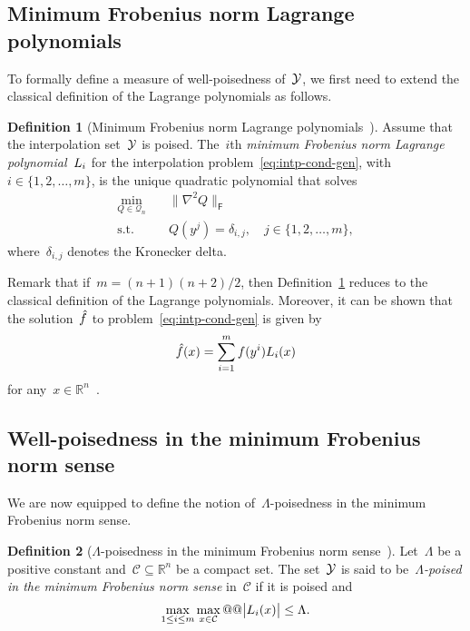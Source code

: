 \documentclass{article}
\makeatletter
\newcounter{cite}
\numberwithin{equation}{section}
\theoremstyle{definition}
\newtheorem{definition}{Definition}[section]
\theoremstyle{plain}
\theoremstyle{remark}
\newcommand*{\abs}[2][]{#1\lvert#2#1\rvert}
\newcommand*{\norm}[2][]{#1\lVert#2#1\rVert}
\newcommand*{\set}[2][]{#1\{#2#1\}}
\newcommand*{\obj}{f}
\newcommand*{\objm}[1][]{\hat{\obj}\ifblank{#1}{}{^{#1}}}
\newcommand*{\R}{\mathbb{R}}
\newcommand*{\lagp}[1][]{L\ifblank{#1}{}{_{#1}}}
\newcommand*{\xpt}[1][]{\mathcal{Y}\ifblank{#1}{}{^{@#1}}}
\newcommand*{\qpoly}{\mathcal{Q}_n}
\newcommand{\reviewed}[1]{\texorpdfstring{{\color{NavyBlue}#1}}{#1}}
\makeatother
\begin{document}
\subsection{\reviewed{Minimum Frobenius norm} Lagrange polynomials}

To formally define a measure of well-poisedness of~$\xpt$, we first need to extend the classical definition of the Lagrange polynomials as follows.

\begin{definition}[\reviewed{Minimum Frobenius norm} Lagrange polynomials~{\cite[Definition~5.1]{Conn_Scheinberg_Vicente_2009}}]
    \label{def:min-norm-lagp}
    Assume that the interpolation set~$\xpt$ is poised.
    The~$i$th \emph{\reviewed{minimum Frobenius norm} Lagrange polynomial}~$\lagp[i]$ for the interpolation problem~\eqref{eq:intp-cond-gen}, with~$i \in \set{1, 2, \dots, m}$, is the unique quadratic polynomial that solves
    \begin{equation*}
        \begin{aligned}
            \min_{Q \in \qpoly} & \quad \norm[\big]{\nabla^2 Q}_{\mathsf{F}}\\
            \text{s.t.}         & \quad Q(y^j) = \delta_{i, j}, \quad j \in \set{1, 2, \dots, m},
        \end{aligned}
    \end{equation*}
    where~$\delta_{i, j}$ denotes the Kronecker delta.
\end{definition}

Remark that if~$m = (n + 1) (n + 2) / 2$, then Definition~\ref{def:min-norm-lagp} reduces to the classical definition of the Lagrange polynomials.
Moreover, it can be shown that the solution~$\objm$ to problem~\eqref{eq:intp-cond-gen} is given by
\begin{equation*}
    \objm(x) = \sum_{i = 1}^m \obj(y^i) \lagp[i](x)
\end{equation*}
for any~$x \in \R^n$~\cite[Lemma~5.2]{Conn_Scheinberg_Vicente_2009}.

\subsection{Well-poisedness in the minimum Frobenius norm sense}

We are now equipped to define the notion of~$\Lambda$-poisedness in the minimum Frobenius norm sense.

\begin{definition}[$\Lambda$-poisedness in the minimum Frobenius norm sense~{\cite[Definition~5.6]{Conn_Scheinberg_Vicente_2009}}]
    \label{def:lambda-p}
    Let~$\Lambda$ be a positive constant and~$\mathcal{C} \subseteq \R^n$ be a compact set.
    The set~$\xpt$ is said to be~\emph{$\Lambda$-poised in the minimum Frobenius norm sense} in~$\mathcal{C}$ if it is poised and
    \begin{equation*}
        \max_{1 \le i \le m} \max_{x \in \mathcal{C}} @@ \abs[\big]{\lagp[i](x)} \le \Lambda.
    \end{equation*}
\end{definition}
\end{document}
